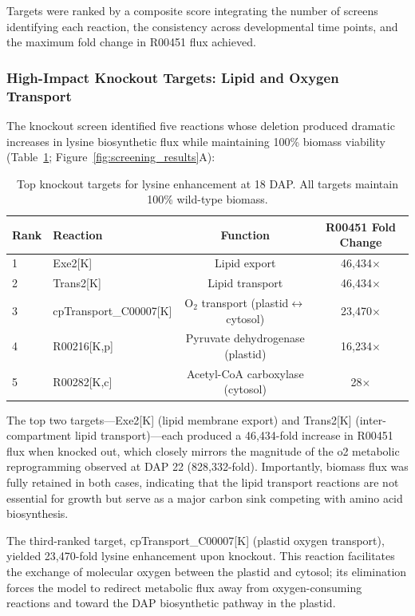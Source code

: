 Targets were ranked by a composite score integrating the number of screens identifying each reaction, the consistency across developmental time points, and the maximum fold change in R00451 flux achieved.

\subsubsection{High-Impact Knockout Targets: Lipid and Oxygen Transport}

The knockout screen identified five reactions whose deletion produced dramatic increases in lysine biosynthetic flux while maintaining 100\% biomass viability (Table~\ref{tab:ko_targets}; Figure~\ref{fig:screening_results}A):

\begin{table}[H]
\centering
\caption{Top knockout targets for lysine enhancement at 18 DAP. All targets maintain 100\% wild-type biomass.}
\label{tab:ko_targets}
\small
\begin{tabular}{llcc}
\toprule
Rank & Reaction & Function & R00451 Fold Change \\
\midrule
1 & Exe2[K] & Lipid export & 46,434$\times$ \\
2 & Trans2[K] & Lipid transport & 46,434$\times$ \\
3 & cpTransport\_C00007[K] & O$_2$ transport (plastid$\leftrightarrow$cytosol) & 23,470$\times$ \\
4 & R00216[K,p] & Pyruvate dehydrogenase (plastid) & 16,234$\times$ \\
5 & R00282[K,c] & Acetyl-CoA carboxylase (cytosol) & 28$\times$ \\
\bottomrule
\end{tabular}
\end{table}

The top two targets---Exe2[K] (lipid membrane export) and Trans2[K] (inter-compartment lipid transport)---each produced a 46,434-fold increase in R00451 flux when knocked out, which closely mirrors the magnitude of the o2 metabolic reprogramming observed at DAP 22 (828,332-fold). Importantly, biomass flux was fully retained in both cases, indicating that the lipid transport reactions are not essential for growth but serve as a major carbon sink competing with amino acid biosynthesis.

The third-ranked target, cpTransport\_C00007[K] (plastid oxygen transport), yielded 23,470-fold lysine enhancement upon knockout. This reaction facilitates the exchange of molecular oxygen between the plastid and cytosol; its elimination forces the model to redirect metabolic flux away from oxygen-consuming reactions and toward the DAP biosynthetic pathway in the plastid.

